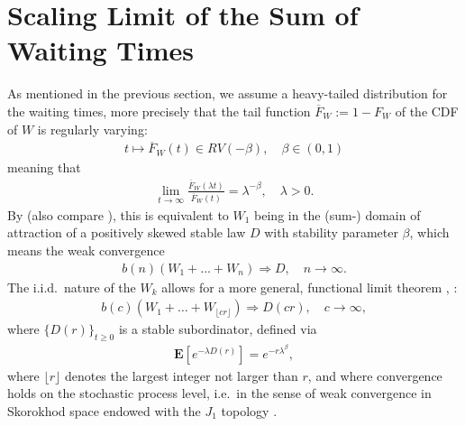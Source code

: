 \documentclass[honours,12pt]{UNSWthesis}
\newcommand{\ex}{\mathbf {E}}
\newcommand{\1}{\mathbf 1}
\numberwithin{equation}{section}
\theoremstyle{definition}
\theoremstyle{remark}
\begin{document}
\section{Scaling Limit of the Sum of Waiting Times}
As mentioned in the previous section, we assume a heavy-tailed distribution 
for the waiting times, more precisely that the tail function 
$\overline F_W := 1 - F_W$ of the CDF of $W$ is regularly varying:
\begin{align}
t \mapsto \overline F_W(t) \in RV(-\beta), \quad \beta \in (0,1)
\end{align}
meaning that \cite{seneta,thebook}
\begin{align*}
\lim_{t \to \infty}\frac{\overline F_W(\lambda t)}{\overline F_W(t)}
= \lambda^{-\beta}, \quad \lambda > 0.
\end{align*}
By \cite[Cor.~8.2.19]{thebook} (also compare \cite[Th.~4.5.1]{Whitt2010}), 
this is equivalent to $W_1$ being in the 
(sum-) domain of attraction of a positively skewed stable law $D$ with 
stability parameter $\beta$, which means the weak convergence
\begin{align}
b(n)(W_1 + \ldots + W_n) \Rightarrow D, \quad n \to \infty.
\end{align}
The i.i.d.\ nature of the $W_k$ allows for a more general, functional limit
theorem \cite[Ex.~11.2.18]{thebook}, \cite[Th.~4.5.3]{Whitt2010}:
\begin{align}
b(c)(W_1 + \ldots + W_{\lfloor cr \rfloor}) \Rightarrow D(cr), 
\quad c \to \infty,
\end{align}
where $\{D(r)\}_{t \ge 0}$ is a stable subordinator, defined via 
\begin{align}
\ex[e^{-\lambda D(r)}] = e^{-r \lambda^\beta},
\end{align}
where $\lfloor r \rfloor$ denotes the largest integer not larger than $r$,
and where convergence holds on the stochastic process level, i.e.\ in the sense
of weak convergence in Skorokhod space endowed with the $J_1$ topology
\cite[Sec.~3.3]{Whitt2010}. 
\end{document}
